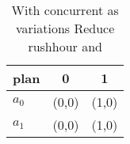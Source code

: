 \documentclass[a4paper]{article}
\begin{document}
\begin{table}
\begin{adjustbox}{width=0.7\columnwidth}
\begin{tabular}{|l|l|l|}
\hline
\textbf{plan} & \multicolumn{1}{c|}{\textbf{0}} & \multicolumn{1}{c|}{\textbf{1}} \\ \hline
\textbf{$a_0$}  & (0,0) & (1,0) \\ \hline
\textbf{$a_1$}  & (0,0) & (1,0) \\ \hline
\end{tabular}
\end{adjustbox}
\caption{With concurrent as variations Reduce rushhour and
}
\end{table}
\end{document}
